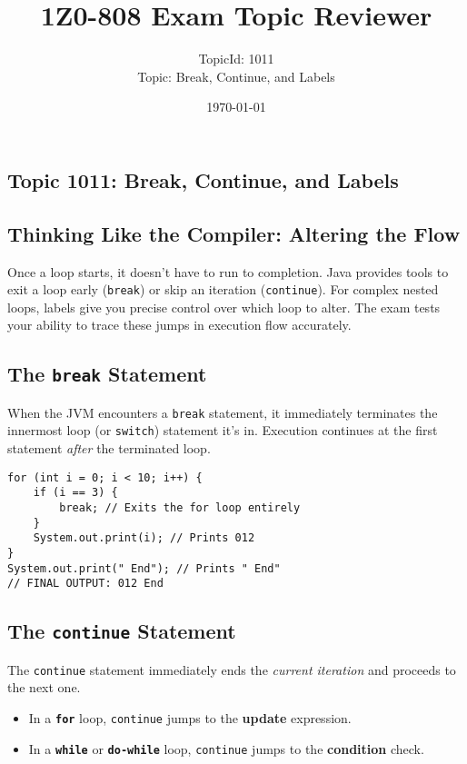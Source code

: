 \documentclass[12pt]{article}
\title{\textbf{1Z0-808 Exam Topic Reviewer}}
\author{TopicId: 1011 \\ Topic: Break, Continue, and Labels}
\date{\today}
\begin{document}
\maketitle
\newpage\begin{enumerate}[label=(\arabic*)]
\section*{Topic 1011: Break, Continue, and Labels}

\subsection*{Thinking Like the Compiler: Altering the Flow}
Once a loop starts, it doesn't have to run to completion. Java provides tools to exit a loop early (\texttt{break}) or skip an iteration (\texttt{continue}). For complex nested loops, labels give you precise control over which loop to alter. The exam tests your ability to trace these jumps in execution flow accurately.

\subsection*{The \texttt{break} Statement}
When the JVM encounters a \texttt{break} statement, it immediately terminates the innermost loop (or \texttt{switch}) statement it's in. Execution continues at the first statement \textit{after} the terminated loop.

\begin{verbatim}
for (int i = 0; i < 10; i++) {
    if (i == 3) {
        break; // Exits the for loop entirely
    }
    System.out.print(i); // Prints 012
}
System.out.print(" End"); // Prints " End"
// FINAL OUTPUT: 012 End
\end{verbatim}

\subsection*{The \texttt{continue} Statement}
The \texttt{continue} statement immediately ends the \textit{current iteration} and proceeds to the next one.
\begin{itemize}
    \item In a \textbf{\texttt{for}} loop, \texttt{continue} jumps to the \textbf{update} expression.
    \item In a \textbf{\texttt{while}} or \textbf{\texttt{do-while}} loop, \texttt{continue} jumps to the \textbf{condition} check.
\end{itemize}


\end{enumerate}
\end{document}

